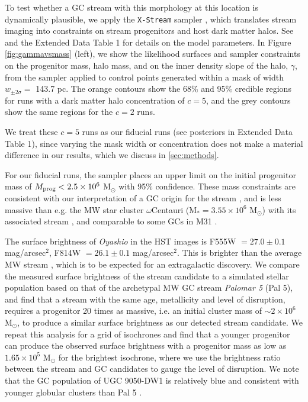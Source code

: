 \documentclass[pdflatex,sn-mathphys-num]{sn-jnl}
\theoremstyle{thmstyleone}
\theoremstyle{thmstyletwo}
\theoremstyle{thmstylethree}
\begin{document}
To test whether a GC stream with this morphology at this location is dynamically plausible, we apply the \texttt{X-Stream} sampler \citep{NibPear2025}, which translates stream imaging into constraints on stream progenitors and host dark matter halos.
See  and the Extended Data Table 1 for details on the model parameters.
In Figure \ref{fig:gammavsmass} (left), we show the likelihood surfaces and sampler constraints on the progenitor mass, halo mass, and on the inner density slope of the halo, $\gamma$, from the sampler applied to control points generated within a mask of width $w_{\pm2\sigma}=$ 143.7 pc.
The orange contours show the 68\% and 95\% credible regions for runs with a dark matter halo concentration of $c = 5$, and the grey contours show the same regions for the $c= 2$ runs.

We treat these $c = 5$ runs as our fiducial runs (see posteriors in Extended Data Table 1), since varying the mask width or concentration does not make a material difference in our results, which we discuss in \ref{sec:methods}.


For our fiducial runs, the sampler places an upper limit on the initial progenitor mass of $M_{\rm prog} < 2.5 \times 10^6$ M$_{\odot}$ with 95\% confidence.
These mass constraints are consistent with our interpretation of a GC origin for the stream \citep[][]{Bonaca2025}, and is less massive than e.g. the MW star cluster $\omega$Centauri (M$_* = 3.55\times 10^6$ M$_\odot$)\citep{Baumgardt2018} with its associated stream \citep{ibata2019}, and comparable to some GCs in M31 \citep{Usher2024}.

The surface brightness of \textit{Oyashio} in the HST images is F555W $=27.0\pm0.1$ mag/arcsec$^2$, F814W $=26.1\pm0.1$ mag/arcsec$^2$. This is brighter than the average MW stream \citep{Shipp2018}, which is to be expected for an extragalactic discovery.
We compare the measured surface brightness of the stream candidate
to a simulated stellar population based on that of the archetypal MW GC stream \textit{Palomar 5} (Pal 5)\citep{Odenkirchen2001}, and find that a stream with the same age, metallicity and level of disruption, requires a progenitor 20 times as massive, i.e. an initial cluster mass of $\sim 2 \times 10^6$ M$_\odot$, to produce a similar surface brightness as our detected stream candidate.
We repeat this analysis for a grid of isochrones and find that a younger progenitor can produce the observed surface brightness with a progenitor mass as low as  $1.65\times10^5$ M$_\odot$ for the brightest isochrone, where we use the brightness ratio between the stream and GC candidates to gauge the level of disruption.
We note that the GC population of UGC 9050-DW1 is relatively blue and consistent with younger globular clusters than Pal 5 \citep{Fielder2023}.
\end{document}
